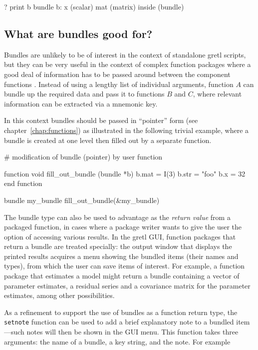 \begin{code}
? print b
bundle b:
 x (scalar)
 mat (matrix)
 inside (bundle)
\end{code}

\subsection{What are bundles good for?}

Bundles are unlikely to be of interest in the context of standalone
gretl scripts, but they can be very useful in the context of complex
function packages where a good deal of information has to be passed
around between the component functions \citep[see][]{GFPG}. Instead of
using a lengthy list of individual arguments, function $A$ can bundle
up the required data and pass it to functions $B$ and $C$, where
relevant information can be extracted via a mnemonic key.

In this context bundles should be passed in ``pointer'' form
(see chapter~\ref{chap:functions}) as illustrated in the following
trivial example, where a bundle is created at one level then filled
out by a separate function.

\begin{code}
# modification of bundle (pointer) by user function

function void fill_out_bundle (bundle *b)
  b.mat =  I(3)
  b.str = "foo"
  b.x = 32
end function

bundle my_bundle 
fill_out_bundle(&my_bundle)
\end{code}

The bundle type can also be used to advantage as the \textit{return
  value} from a packaged function, in cases where a package writer
wants to give the user the option of accessing various results. In the
gretl GUI, function packages that return a bundle are treated
specially: the output window that displays the printed results
acquires a menu showing the bundled items (their names and types),
from which the user can save items of interest. For example, a
function package that estimates a model might return a bundle 
containing a vector of parameter estimates, a residual series and a
covariance matrix for the parameter estimates, among other
possibilities.

As a refinement to support the use of bundles as a function return
type, the \texttt{setnote} function can be used to add a brief
explanatory note to a bundled item---such notes will then be shown in
the GUI menu.  This function takes three arguments: the name of a
bundle, a key string, and the note. For example

